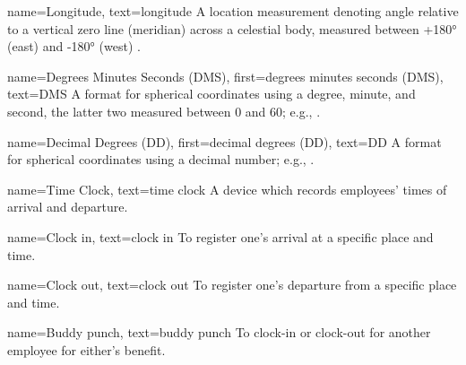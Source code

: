 {
  name={Longitude},
  text={longitude}
}
{
  A location measurement denoting angle relative to a
  vertical zero line (meridian) across a celestial body,
  measured between +\ang{180} (east) and -\ang{180} (west)
  \parencite{coordSystems}.
}

{
  name={Degrees Minutes Seconds (DMS)},
  first={degrees minutes seconds (DMS)},
  text={DMS}
}
{
  A format for spherical coordinates using a degree,
  minute,
  and second, the latter two measured between 0 and 60;
  e.g.,  \parencite{coordSystems}.
}

{
  name={Decimal Degrees (DD)},
  first={decimal degrees (DD)},
  text={DD}
}
{
  A format for spherical coordinates using a decimal
  number;
  e.g.,  \parencite{coordSystems}.
}

{
  name={Time Clock},
  text={time clock}
}
{
  A device which records employees' times of arrival and
  departure.
}

{
  name={Clock in},
  text={clock in}
}
{
  To register one's arrival at a specific place and time.
}

{
  name={Clock out},
  text={clock out}
}
{
  To register one's departure from a specific place and
  time.
}

{
  name={Buddy punch},
  text={buddy punch}
}
{
  To clock-in or clock-out for another employee for
  either's benefit.
}